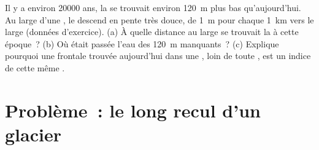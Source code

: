 \begin{exercise}[$\star\star\star$]\label{exo:g8:ice-on-earth:12}
Il y a environ \num{20000} ans, la  se trouvait environ \qty{120}{m}
plus bas qu'aujourd'hui. Au large d'une , le 
descend en pente très douce, de \qty{1}{m} pour chaque \qty{1}{km} vers le
large (données d'exercice). (a) À quelle distance au large se trouvait
la  à cette époque~? (b) Où était passée l'eau des \qty{120}{m}
manquants~? (c) Explique pourquoi une  frontale trouvée aujourd'hui
dans une , loin de toute , est un indice de cette même
.
\end{exercise}

\section{Problème~: le long recul d'un glacier}

